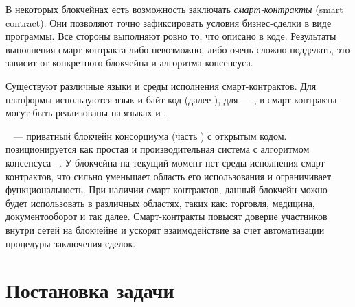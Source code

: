 В некоторых блокчейнах есть возможность заключать \emph{смарт-кон\-трак\-ты} (smart con\-tract).
Они позволяют точно зафиксировать условия бизнес-сдел\-ки в виде программы.
Все стороны выполняют ровно то, что описано в коде.
Результаты выполнения смарт-контракта либо невозможно, либо очень сложно подделать, это зависит от конкретного блокчейна и алгоритма консенсуса.

Существуют различные языки и среды исполнения смарт-кон\-трак\-тов.
Для платформы  используются язык  и байт-код  (далее ), для  --- , в  смарт-контракты могут быть реализованы на языках  и .

~\cite{iroha} --- приватный блокчейн консорциума  (часть ) с открытым кодом.
 позиционируется как простая и производительная система с алгоритмом консенсуса ~\cite{YAC}.
У блокчейна  на текущий момент нет среды исполнения смарт-контрактов, что сильно уменьшает область его использования и ограничивает функциональность.
При наличии смарт-контрактов, данный блокчейн можно будет использовать в различных областях, таких как: торговля, медицина, документооборот и так далее.
Смарт-контракты повысят доверие участников внутри сетей на блокчейне  и ускорят взаимодействие за счет автоматизации процедуры заключения сделок.


\section{Постановка задачи}

